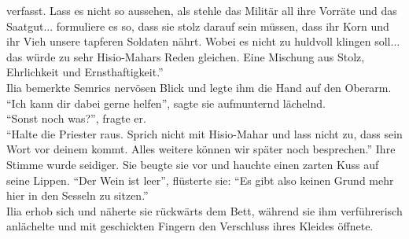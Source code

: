 verfasst. Lass es nicht so aussehen, als stehle das Militär all ihre Vorräte und das Saatgut... 
formuliere es so, dass sie stolz darauf sein müssen, dass ihr Korn und ihr Vieh unsere tapferen 
Soldaten nährt. Wobei es nicht zu huldvoll klingen soll... das würde zu sehr Hisio-Mahars Reden 
gleichen. Eine Mischung aus Stolz, Ehrlichkeit und Ernsthaftigkeit.''\\
Ilia bemerkte Semrics nervösen Blick und legte ihm die Hand auf den Oberarm. ``Ich kann dir dabei 
gerne helfen'', sagte sie aufmunternd lächelnd.\\
``Sonst noch was?'', fragte er.\\
``Halte die Priester raus. Sprich nicht mit Hisio-Mahar und lass nicht zu, dass sein Wort vor 
deinem kommt. Alles weitere können wir später noch besprechen.'' Ihre Stimme wurde seidiger. Sie 
beugte sie vor und hauchte einen zarten Kuss auf seine Lippen. ``Der Wein ist leer'', flüsterte sie: 
``Es gibt also keinen Grund mehr hier in den Sesseln zu sitzen.''\\
Ilia erhob sich und näherte sie rückwärts dem Bett, während sie ihm verführerisch anlächelte und 
mit geschickten Fingern den Verschluss ihres Kleides öffnete.\\


